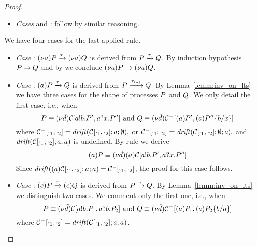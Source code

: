 \begin{proof}
\begin{itemize}
%
\item \emph{Cases}  and  : follow by similar reasoning. %
\end{itemize}
We have four cases for the last applied rule.
\begin{itemize}
\item \emph{Case} : $(\nu a)P\xrightarrow{\tau}(\nu a)Q$ is derived from $P\xrightarrow{\tau}Q.$ By induction hypothesis $P\rightarrow Q$ and by  we conclude $(\nu a)P\rightarrow(\nu a)Q$. 
%
\item \emph{Case} : $(a)P\xrightarrow{\tau}Q$ is derived from $P\xrightarrow{\tau_{(a)}}Q.$ By Lemma~\ref{lemm:inv_on_lts} we have three cases for the shape of processes $P$ and $Q$. We only detail the first case, i.e., when 
\[
P\equiv (\nu \tilde {d})\mathcal{C}[a!b.P', a?x.P''] \text{ and }
 Q\equiv(\nu \tilde {d})\mathcal{C}^-[(a)P', (a)P''\{b/x\}]
 \]
  where $\mathcal{C}^-[\cdot_1, \cdot_2]=\mathit {drift}(\mathcal{C}[\cdot_1, \cdot_2]; a;\emptyset),$ or $\mathcal{C}^-[\cdot_1; \cdot_2]=\mathit {drift}(\mathcal{C}[\cdot_1, \cdot_2]; \emptyset; a),$ and
  $\mathit {drift}(\mathcal{C}[\cdot_1, \cdot_2]; a; a)$ is undefined. By rule
    we derive 
   \[
   (a)P\equiv (\nu \tilde {d})(a)\mathcal{C}[a!b.P', a?x.P'']
   \]
Since $\mathit {drift}((a)\mathcal{C}[\cdot_1, \cdot_2]; a;a)=\mathcal{C}^-[\cdot_1, \cdot_2]$, the proof for this case follows. %
\item \emph{Case} :  $(c)P\xrightarrow{\tau}(c)Q$ is derived from $P\xrightarrow{\tau}Q$. %
By Lemma~\ref{lemm:inv_on_lts} we distinguish two cases. We comment only the first one, i.e., when  
 \[
 P\equiv (\nu \tilde {d})\mathcal{C}[a!b.P_1, a?b.P_2] \text{ and } 
  Q\equiv (\nu \tilde {d})\mathcal{C}^-[(a)P_1, (a)P_2\{b/a\}]
  \] 
  where $\mathcal{C}^-[\cdot_1, \cdot_2]=\mathit {drift}(\mathcal{C}[\cdot_1, \cdot_2]; a; a)$.

\end{itemize}
\end{proof}
